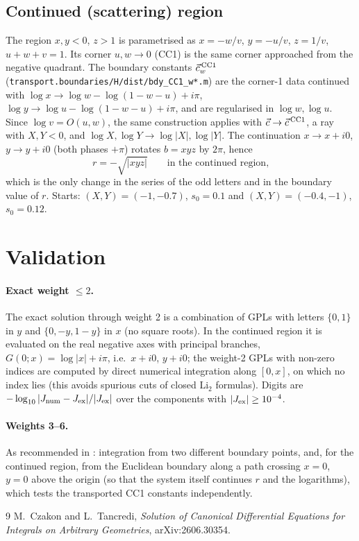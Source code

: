 \documentclass[11pt,a4paper]{article}
\begin{document}
\subsection{Continued (scattering) region}
The region $x,y<0$, $z>1$ is parametrised as $x=-w/v$, $y=-u/v$, $z=1/v$, $u+w+v=1$.  Its corner
$u,w\to0$ (CC1) is the same corner approached from the negative quadrant.  The boundary constants
$\vec c^{\,\rm CC1}_w$ (\texttt{transport.boundaries/H/dist/bdy\_CC1\_w*.m}) are the corner-1 data continued with
$\log x\to\log w-\log(1-w-u)+i\pi$, $\log y\to\log u-\log(1-w-u)+i\pi$, and are regularised in $\log w,\log u$.
Since $\log v=O(u,w)$, the same construction applies with $\vec c\to\vec c^{\,\rm CC1}$, a ray with $X,Y<0$, and
$\log X,\log Y\to\log|X|,\log|Y|$.  The continuation $x\to x+i0$, $y\to y+i0$ (both phases $+\pi$) rotates $b=xyz$ by
$2\pi$, hence
\begin{equation}
 r=-\sqrt{|xyz|}\qquad\text{in the continued region,}
\end{equation}
which is the only change in the series of the odd letters and in the boundary value of $r$.
Starts: $(X,Y)=(-1,-0.7)$, $s_0=0.1$ and $(X,Y)=(-0.4,-1)$, $s_0=0.12$.

\section{Validation}
\paragraph{Exact weight $\le2$.}
The exact solution through weight 2 is a combination of GPLs with letters $\{0,1\}$ in $y$ and $\{0,-y,1-y\}$ in $x$
(no square roots).  In the continued region it is evaluated on the real negative axes with principal branches,
$G(0;x)=\log|x|+i\pi$, i.e.\ $x+i0$, $y+i0$; the weight-2 GPLs with non-zero indices are computed by direct
numerical integration along $[0,x]$, on which no index lies (this avoids spurious cuts of closed $\mathrm{Li}_2$ formulas).
Digits are $-\log_{10}|J_{\rm num}-J_{\rm ex}|/|J_{\rm ex}|$ over the components with $|J_{\rm ex}|\ge10^{-4}$.

\paragraph{Weights 3--6.}
As recommended in \cite{CT}: integration from two different boundary points, and, for the continued region, from
the Euclidean boundary along a path crossing $x=0$, $y=0$ above the origin (so that the system itself continues
$r$ and the logarithms), which tests the transported CC1 constants independently.


\begin{thebibliography}{9}
 M.~Czakon and L.~Tancredi, \emph{Solution of Canonical Differential Equations for Integrals on Arbitrary
Geometries}, arXiv:2606.30354.
\end{thebibliography}
\end{document}
